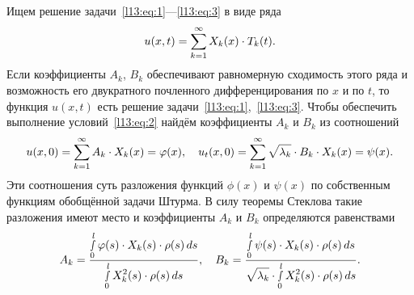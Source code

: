 Ищем решение задачи~\eqref{l13:eq:1}---\eqref{l13:eq:3} в виде ряда
\begin{equation*}
	\hfill u(x,t)=\sum\limits_{k=1}^{\infty}X_k(x)\cdot T_k(t).\hfill
\end{equation*}
Если коэффициенты $A_k$, $B_k$ обеспечивают равномерную сходимость этого ряда и возможность его двукратного почленного дифференцирования по $x$ и по $t$, то функция $u(x,t)$ есть решение задачи~\eqref{l13:eq:1},~\eqref{l13:eq:3}. Чтобы обеспечить выполнение условий~\eqref{l13:eq:2} найдём коэффициенты $A_k$ и $B_k$ из соотношений 
\begin{equation*}
	\hfill u(x,0)=\sum\limits_{k=1}^{\infty}A_k\cdot X_k(x)=\phi(x),\quad u_t(x,0)=\sum\limits_{k=1}^{\infty}\sqrt{\lambda_k}\cdot B_k\cdot X_k(x)=\psi(x). \hfill
\end{equation*}
Эти соотношения суть разложения функций $\phi(x)$ и $\psi(x)$ по собственным функциям обобщённой задачи Штурма. В силу теоремы Стеклова такие разложения имеют место и коэффициенты $A_k$ и $B_k$ определяются равенствами
\begin{equation*}
	\hfill A_k=\frac{\displaystyle\smallint\limits_0^l\phi(s)\cdot X_k(s)\cdot\rho(s)\,ds}{\displaystyle\smallint\limits_0^l X^2_k(s)\cdot\rho(s)\,ds},\quad B_k=\frac{\displaystyle\smallint\limits_0^l\psi(s)\cdot X_k(s)\cdot\rho(s)\,ds}{\displaystyle\sqrt{\lambda_k}\cdot\smallint\limits_0^l X^2_k(s)\cdot\rho(s)\,ds}.\hfill
\end{equation*}
